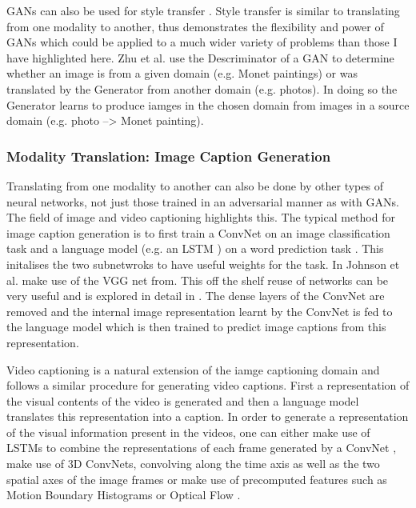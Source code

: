 GANs can also be used for style transfer \cite{zhu2017unpaired}. Style transfer is similar to translating from one modality to another, thus \cite{zhu2017unpaired} demonstrates the flexibility and power of \ac{GAN}s which could be applied to a much wider variety of problems than those I have highlighted here. Zhu et al. use the Descriminator of a \ac{GAN} to determine whether an image is from a given domain (e.g. Monet paintings) or was translated by the Generator from another domain (e.g. photos). In doing so the Generator learns to produce iamges in the chosen domain from images in a source domain (e.g. photo --> Monet painting).

\subsubsection{Modality Translation: Image Caption Generation}
Translating from one modality to another can also be done by other types of neural networks, not just those trained in an adversarial manner as with \ac{GAN}s.
The field of image and video captioning highlights this. The typical method for image caption generation is to first train a ConvNet on an image classification task and a language model (e.g. an \ac{LSTM} \cite{hochreiter1997long}) on a word prediction task \cite{vinyals2015show, venugopalan2014translating, johnson2016densecap}. This initalises the two subnetwroks to have useful weights for the task. In \cite{johnson2016densecap} Johnson et al. make use of the VGG net from\cite{simonyan2014very}. This off the shelf reuse of networks can be very useful and is explored in detail in \cite{keller}.
The dense layers of the \ac{ConvNet} are removed and the internal image representation learnt by the \ac{ConvNet} is fed to the language model which is then trained to predict image captions from this representation.

Video captioning is a natural extension of the iamge captioning domain and follows a similar procedure for generating video captions. First a representation of the visual contents of the video is generated and then a language model translates this representation into a caption. In order to generate a representation of the visual information  present in the videos, one can either make use of \ac{LSTM}s to combine the representations of each frame generated by a \ac{ConvNet} \cite{donahue2015long}, make use of 3D \ac{ConvNet}s, convolving along the time axis as well as the two spatial axes of the image frames \cite{yao2015describing, yao2015video} or make use of precomputed features such as Motion Boundary Histograms or Optical Flow \cite{rohrbach2014coherent, rohrbach2013translating}.


